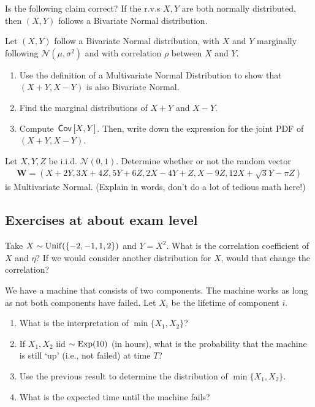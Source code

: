 \documentclass[assignments]{subfiles}
\begin{document}
\begin{exercise}
Is the following claim correct? If the r.v.s $X, Y$ are both normally distributed, then $(X, Y)$ follows a Bivariate Normal distribution.
\end{exercise}

\begin{exercise}
Let $(X,Y)$ follow a Bivariate Normal distribution, with $X$ and $Y$ marginally following $\mathcal{N}(\mu,\sigma^2)$ and with correlation $\rho$ between $X$ and $Y$.
\begin{enumerate}
\item Use the definition of a Multivariate Normal Distribution to show that $(X+Y, X-Y)$ is also Bivariate Normal.
\item Find the marginal distributions of $X+Y$ and $X-Y$.
\item Compute $\,\mathsf{Cov}\left[X,Y\right]$. Then, write down the expression for the joint PDF of $(X+Y, X-Y)$.
\end{enumerate}
\end{exercise}

\begin{exercise}
Let $X, Y, Z$ be i.i.d. $\mathcal{N}(0,1).$ Determine whether or not the random vector
\begin{align*}
    \mathbf{W} = (X+2Y, 3X+4Z, 5Y+6Z, 2X-4Y+Z, X-9Z, 12X+\sqrt{3}Y -\pi Z)
\end{align*}
is Multivariate Normal. (Explain in words, don't do a lot of tedious math here!)
\end{exercise}


\subsection{Exercises at about exam level}
\label{sec:exercises-at-about}





\begin{exercise}
Take $X\sim\mathrm{Unif}(\{-2, -1, 1, 2\})$ and $Y= X^2$. What is the correlation coefficient of $X$ and $\eta$?
If we would consider another distribution for $X$, would that change the correlation?
\end{exercise}



\begin{exercise}
We have a machine that consists of two components. The machine works as long as not both components have failed. Let $X_i$ be the lifetime of component $i$.
\begin{enumerate}
\item What is the interpretation of $\min\{X_1, X_{2}\}$?
\item If $X_1, X_2$ iid $\sim \mathrm{Exp}(10)$ (in hours), what is the probability that the machine is still `up' (i.e., not failed) at time $T$?
\item Use the previous result to determine the distribution of $\min \{X_1, X_2\}$.
\item What is the expected time until the machine fails?
\end{enumerate}
\end{exercise}
\end{document}
